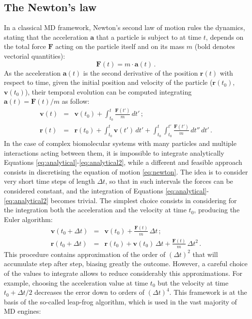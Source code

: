 \subsection{The Newton's law}

In a classical MD framework, Newton's second law of motion rules the dynamics, stating that the acceleration $\textbf{a}$ that a particle is subject to at time $t$, depends on the total force $\textbf{F}$ acting on the particle itself and on its mass $m$ (bold denotes vectorial quantities):
\begin{equation} \label{eq:newton}
\textbf{F}(t) =  m \cdot \textbf{a}(t) \, .
\end{equation}
As the acceleration $\textbf{a}(t)$ is the second derivative of the position $\textbf{r}(t)$ with respect to time, given the initial position and velocity of the particle ($\textbf{r}(t_0)$, $\textbf{v}(t_0)$), their temporal evolution can be computed integrating $\textbf{a}(t) = \textbf{F}(t)/m$ as follow:
\begin{eqnarray} \label{eq:analytical}
\mathbf{v}(t) &=& \mathbf{v}(t_0) + \int_{t_0}^t \frac{\mathbf{F}(t')}{m} \, dt' \, ; \\
\mathbf{r}(t) &=& \mathbf{r}(t_0) + \int_{t_0}^t \mathbf{v}(t') \, dt' + \int_{t_0}^t \int_{t_0}^{t'} \frac{\mathbf{F}(t')}{m} \, dt'' \, dt'\, . \label{eq:analytical2}
\end{eqnarray}
%
In the case of complex biomolecular systems with many particles and multiple interactions acting between them, it is impossible to integrate analytically Equations \ref{eq:analytical}-\ref{eq:analytical2}, while a different and feasible approach consists in discretising the equation of motion \ref{eq:newton}.
%
The idea is to consider very short time steps of length $\Delta t$, so that in such intervals the forces can be considered constant, and the integration of Equations \ref{eq:analytical}-\ref{eq:analytical2} becomes trivial.
%
The simplest choice consists in considering for the integration both the acceleration and the velocity at time $t_0$, producing the Euler algorithm:
\begin{eqnarray} \label{eq:euler}
\mathbf{v}(t_0 + \Delta t) &=& \mathbf{v}(t_0) + \frac{\mathbf{F}(t)}{m} \, \Delta t \,; \\
\mathbf{r}(t_0 + \Delta t) &=& \mathbf{r}(t_0) + \mathbf{v}(t_0) \, \Delta t + \frac{\mathbf{F}(t)}{m} \, \Delta t^2 \,. \label{eq:euler2}
\end{eqnarray}
%
This procedure contains approximation of the order of $(\Delta t)^2$ that will accumulate step after step, biasing greatly the outcome. However, a careful choice of the values to integrate allows to reduce considerably this approximations. For example, choosing the acceleration value at time $t_0$ but the velocity at time $t_0 + \Delta t/2$ decreases the error down to orders of $(\Delta t)^4$. This framework is at the basis of the so-called leap-frog algorithm, which is used in the vast majority of MD engines:
